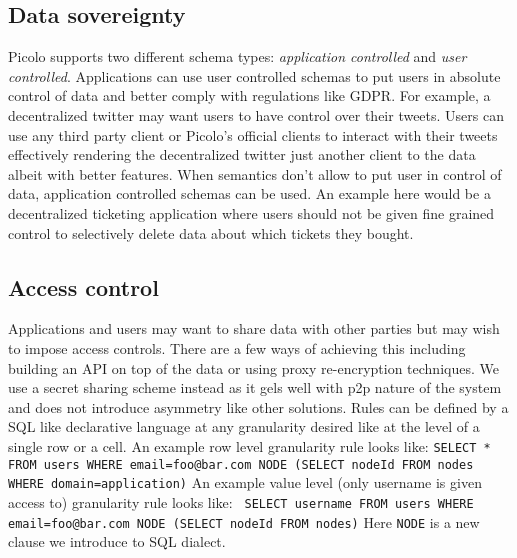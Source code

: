 \subsection{Data sovereignty}
Picolo supports two different schema types: \textit{application controlled} and \textit{user controlled}. Applications can use user controlled schemas to put users in absolute control of data and better comply with regulations like GDPR. For example, a decentralized twitter may  want users to have control over their tweets. Users can use any third party client or Picolo's official clients to interact with their tweets effectively rendering the decentralized twitter just another client to the data albeit with better features. \newline\newline
When semantics don't allow to put user in control of data, application controlled schemas can be used. An example here would be a decentralized ticketing application where users should not be given fine grained control to selectively delete data about which tickets they bought.
\subsection{Access control} \label{sec:access_control}
Applications and users may want to share data with other parties but may wish to impose access controls. There are a few ways of achieving this including building an API on top of the data or using proxy re-encryption techniques. We use a secret sharing scheme instead as it gels well with p2p nature of the system and does not introduce asymmetry like other solutions. Rules can be defined by a SQL like declarative language at any granularity desired like at the level of a single row or a cell. An example row level granularity rule looks like:\newline \newline
\texttt{SELECT  * \newline FROM users \newline WHERE email=foo@bar.com \newline NODE (SELECT nodeId FROM nodes WHERE domain=application)} \newline \newline
An example value level (only username is given access to) granularity rule looks like:\newline \newline
\texttt{ SELECT username \newline FROM users \newline WHERE email=foo@bar.com \newline NODE (SELECT nodeId FROM nodes)}\newline\newline
Here \texttt{NODE} is a new clause we introduce to SQL dialect.
